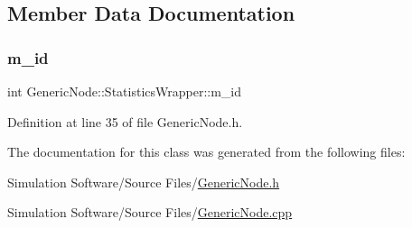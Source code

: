 \subsection{Member Data Documentation}
\mbox{\label{class_generic_node_1_1_statistics_wrapper_a88b9f2826d0e737d9afc89a4f806535f}} 
\subsubsection{\texorpdfstring{m\+\_\+id}{m\_id}}
{\footnotesize\ttfamily int Generic\+Node\+::\+Statistics\+Wrapper\+::m\+\_\+id\hspace{0.3cm}{\ttfamily [protected]}}



Definition at line 35 of file Generic\+Node.\+h.



The documentation for this class was generated from the following files\+:\begin{DoxyCompactItemize}
\item 
Simulation Software/\+Source Files/\hyperlink{_generic_node_8h}{Generic\+Node.\+h}\item 
Simulation Software/\+Source Files/\hyperlink{_generic_node_8cpp}{Generic\+Node.\+cpp}\end{DoxyCompactItemize}
